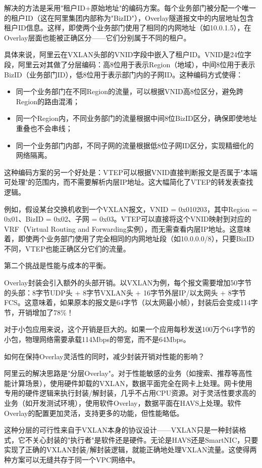 解决的方法是采用"租户ID+原始地址"的编码方案。每个业务部门被分配一个唯一的租户ID（这在阿里集团内部称为"BizID"），Overlay隧道报文中的内层地址包含租户ID信息。这样，即使两个业务部门使用了相同的内网地址（如10.0.1.5），在Overlay层面也能被正确区分——它们分别属于不同的租户。

具体来说，阿里云在VXLAN头部的VNID字段中嵌入了租户ID。VNID是24位字段，阿里云对其做了分层编码：高8位用于表示Region（地域），中间8位用于表示BizID（业务部门ID），低8位用于表示部门内的子网ID。这种编码方式使得：
\begin{itemize}
    \item 同一个业务部门在不同Region的流量，可以根据VNID高8位区分，避免跨Region的路由混淆；
    \item 同一个Region内，不同业务部门的流量根据中间8位BizID区分，确保即使地址重叠也不会串线；
    \item 同一个业务部门内部，不同子网的流量根据低8位子网ID区分，实现精细化的网络隔离。
\end{itemize}
这种编码方案的另一个好处是：VTEP可以根据VNID直接判断报文是否属于"本端可处理"的范围内，而不需要解析内层IP地址。这大幅简化了VTEP的转发表查找逻辑。

例如，假设某台交换机收到一个VXLAN报文，VNID = 0x010203，其中Region = 0x01、BizID = 0x02、子网 = 0x03。VTEP可以直接将这个VNID映射到对应的VRF（Virtual Routing and Forwarding实例），而无需查看内层IP地址。这意味着，即使两个业务部门使用了完全相同的内网地址段（如10.0.0.0/8），只要BizID不同，VTEP也能正确区分它们的流量。

第二个挑战是性能与成本的平衡。

Overlay封装会引入额外的头部开销。以VXLAN为例，每个报文需要增加50字节的头部：8字节UDP头 + 8字节VXLAN头 + 16字节外层IP/以太网头 + 8字节FCS。这意味着，如果原本的报文是64字节（以太网最小帧），封装后会变成114字节，开销增加了78\%！

对于小包应用来说，这个开销是巨大的。如果一个应用每秒发送100万个64字节的小包，物理网络需要承载114Mbps的带宽，而不是64Mbps。

如何在保持Overlay灵活性的同时，减少封装开销对性能的影响？

阿里云的解决思路是"分层Overlay"。对于性能敏感的业务（如搜索、推荐等高性能计算场景），使用硬件卸载的VXLAN，数据平面完全在网卡上处理。网卡使用专用的硬件逻辑来执行封装/解封装，几乎不占用CPU资源。对于灵活性要求高的业务（如开发测试环境），使用软件Overlay，数据平面在HAVS上处理。软件Overlay的配置更加灵活，支持更多的功能，但性能略低。

这种分层的可行性来自于VXLAN本身的协议设计——VXLAN只是一种封装格式，它不关心封装的"执行者"是软件还是硬件。无论是HAVS还是SmartNIC，只要实现了正确的VXLAN封装/解封装逻辑，就能正确地处理VXLAN流量。这使得两种方案可以无缝共存于同一个VPC网络中。

